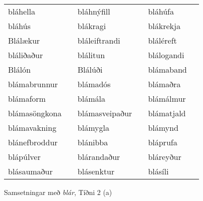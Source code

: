 \documentclass[../samsetningasafn.tex]{subfiles}
\begin{document}
\begin{wordlist}[H]
\begin{tcolorbox}
\begin{tabular}{BlBlBl}
		bláhella			&		& 	
		bláhnýfill		&		& 		
		bláhúfa			&		\\ 	%
		bláhús			&		& 		
		blákragi			&		& 		
		blákrekja		&		\\ 	%
		Blálækur		&		& 	
		bláleiftrandi		&		& 		
		bláléreft			&		\\ 	%
		bláliðaður		&		& 		
		blálitun			&		& 	
		blálogandi		&		\\ 	%
		Blálón			&		& 	
		Blálúði			&		& 		
		blámaband		&		\\ 	%
		blámabrunnur	&		& 	
		blámadós		&		& 		
		blámaðra		&		\\ 		%
		blámaform		&		& 		
		blámála			&		& 	
		blámálmur		&		\\ 		%
		blámasöngkona	&		& 		
		blámasveipaður	&		& 		
		blámatjald		&		\\ 		%
		blámavakning	&		& 	
		blámygla		&		& 		
		blámynd			&		\\ 		%
		blánefbroddur	&		& 	
		blánibba			&		& 		
		bláprufa			&		\\ 		%
		blápúlver		&		& 		
		blárandaður		&		& 		
		bláreyður		&		\\ 	%
		blásaumaður		&		& 		
		blásenktur		&		& 	
		blásíli			&		 		%
	\end{tabular}

\end{tcolorbox}
	\caption{Samsetningar með \textit{blár}, Tíðni 2 (a)}
	\label{listi:blatt.2a}
\end{wordlist}	
\end{document}

